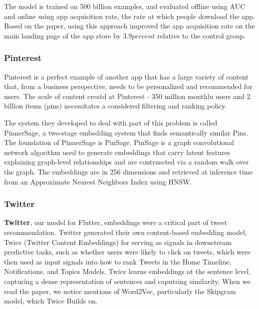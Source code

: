 \documentclass[11pt, table]{diazessay} %
\begin{document}
\begin{sloppypar}
The model is trained on 500 billion examples, and evaluated offline using AUC and online using app acquisition rate, the rate at which people download the app. Based on the paper, using this approach improved the app acquisition rate on the main landing page of the app store by $3.9 percent$ relative to the control group.

\subsubsection{Pinterest}

Pinterest is a perfect example of another app that has a large variety of content that, from a business perspective, needs to be personalized and recommended for users. The scale of content creatd at Pinterest - 350 million monthlu users and 2 billion items (pins) necessitates a considered filtering and ranking policy. 

The system they developed to deal with part of this problem is called PinnerSage, a two-stage embedding system that finds semantically similar Pins\citep{pal2020pinnersage}. The foundation of PinnerSage is PinSage\citep{ying2018graph}. PinSage is a graph convolutional network algorithm used to generate embeddings that carry latent features explaining graph-level relationships and are contruscted via a random walk over the graph. The embeddings are in 256 dimensions and retrieved at inference time from an Approximate Nearest Neighbors Index using HNSW. 


\subsubsection{Twitter}
\textbf{Twitter}, our model for Flutter, embeddings were a critical part of tweet recommendation. Twitter generated their own content-based embedding model, Twice (Twitter Content Embeddings)\citep{liu2022twice} for serving as signals in downstream predictive tasks, such as whether users were likely to click on tweets, which were then used as input signals into how to rank Tweets in the Home Timeline, Notifications, and Topics Models. Twice learns embeddings at the sentence level, capturing a dense representation of sentences and caputring similarity. When we read the paper, we notice mentions of Word2Vec, particularly the Skipgram model, which Twice Builds on. 


\end{sloppypar}
\end{document}
